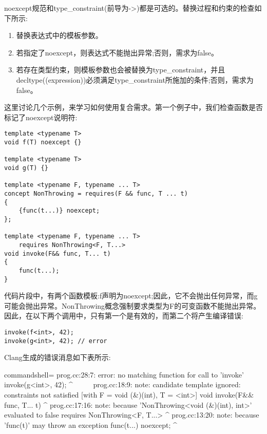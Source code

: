 noexcept规范和type\_constraint(前导为->)都是可选的。替换过程和约束的检查如下所示:

\begin{enumerate}
\item
替换表达式中的模板参数。

\item
若指定了noexcept，则表达式不能抛出异常;否则，需求为false。

\item
若存在类型约束，则模板参数也会被替换为type\_constraint，并且decltype((expression))必须满足type\_constraint所施加的条件;否则，需求为false。
\end{enumerate}

这里讨论几个示例，来学习如何使用复合需求。第一个例子中，我们检查函数是否标记了noexcept说明符:

\begin{lstlisting}[style=styleCXX]
template <typename T>
void f(T) noexcept {}

template <typename T>
void g(T) {}

template <typename F, typename ... T>
concept NonThrowing = requires(F && func, T ... t)
{
	{func(t...)} noexcept;
};

template <typename F, typename ... T>
	requires NonThrowing<F, T...>
void invoke(F&& func, T... t)
{
	func(t...);
}
\end{lstlisting}

代码片段中，有两个函数模板:f声明为noexcept;因此，它不会抛出任何异常，而g可能会抛出异常。NonThrowing概念强制要求类型为F的可变函数不能抛出异常。因此，在以下两个调用中，只有第一个是有效的，而第二个将产生编译错误:

\begin{lstlisting}[style=styleCXX]
invoke(f<int>, 42);
invoke(g<int>, 42); // error
\end{lstlisting}

Clang生成的错误消息如下表所示:

\begin{tcblisting}{commandshell={}}
prog.cc:28:7: error: no matching function for call to 'invoke'
      invoke(g<int>, 42);
       ^~~~~~
prog.cc:18:9: note: candidate template ignored: constraints not
satisfied [with F = void (&)(int), T = <int>]
   void invoke(F&& func, T... t)
          ^
prog.cc:17:16: note: because 'NonThrowing<void (&)(int), int>'
evaluated to false
      requires NonThrowing<F, T...>
                  ^
prog.cc:13:20: note: because 'func(t)' may throw an exception
      {func(t...)} noexcept;
                       ^
\end{tcblisting}

